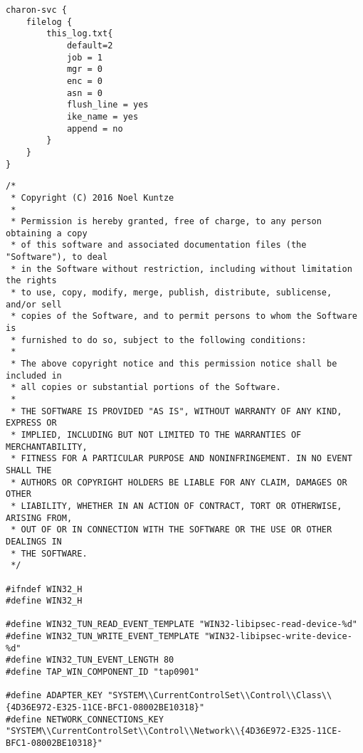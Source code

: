 \begin{center}
\label{lst:strongswan.conf}
\begin{lstlisting}[caption=Testkonfiguration - strongswan.conf]
charon-svc {
	filelog {
		this_log.txt{
			default=2
			job = 1
			mgr = 0
			enc = 0 
			asn = 0
			flush_line = yes
			ike_name = yes
			append = no
		}
	}
}
\end{lstlisting}
\end{center}

\begin{center}
\label{lst:libstrongswan-win32.h}
\begin{lstlisting}[caption=Code von win32.h]
/*
 * Copyright (C) 2016 Noel Kuntze
 *
 * Permission is hereby granted, free of charge, to any person obtaining a copy
 * of this software and associated documentation files (the "Software"), to deal
 * in the Software without restriction, including without limitation the rights
 * to use, copy, modify, merge, publish, distribute, sublicense, and/or sell
 * copies of the Software, and to permit persons to whom the Software is
 * furnished to do so, subject to the following conditions:
 *
 * The above copyright notice and this permission notice shall be included in
 * all copies or substantial portions of the Software.
 *
 * THE SOFTWARE IS PROVIDED "AS IS", WITHOUT WARRANTY OF ANY KIND, EXPRESS OR
 * IMPLIED, INCLUDING BUT NOT LIMITED TO THE WARRANTIES OF MERCHANTABILITY,
 * FITNESS FOR A PARTICULAR PURPOSE AND NONINFRINGEMENT. IN NO EVENT SHALL THE
 * AUTHORS OR COPYRIGHT HOLDERS BE LIABLE FOR ANY CLAIM, DAMAGES OR OTHER
 * LIABILITY, WHETHER IN AN ACTION OF CONTRACT, TORT OR OTHERWISE, ARISING FROM,
 * OUT OF OR IN CONNECTION WITH THE SOFTWARE OR THE USE OR OTHER DEALINGS IN
 * THE SOFTWARE.
 */

#ifndef WIN32_H
#define WIN32_H

#define WIN32_TUN_READ_EVENT_TEMPLATE "WIN32-libipsec-read-device-%d"
#define WIN32_TUN_WRITE_EVENT_TEMPLATE "WIN32-libipsec-write-device-%d"
#define WIN32_TUN_EVENT_LENGTH 80
#define TAP_WIN_COMPONENT_ID "tap0901"

#define ADAPTER_KEY "SYSTEM\\CurrentControlSet\\Control\\Class\\{4D36E972-E325-11CE-BFC1-08002BE10318}"
#define NETWORK_CONNECTIONS_KEY "SYSTEM\\CurrentControlSet\\Control\\Network\\{4D36E972-E325-11CE-BFC1-08002BE10318}"


\end{lstlisting}
\end{center}
